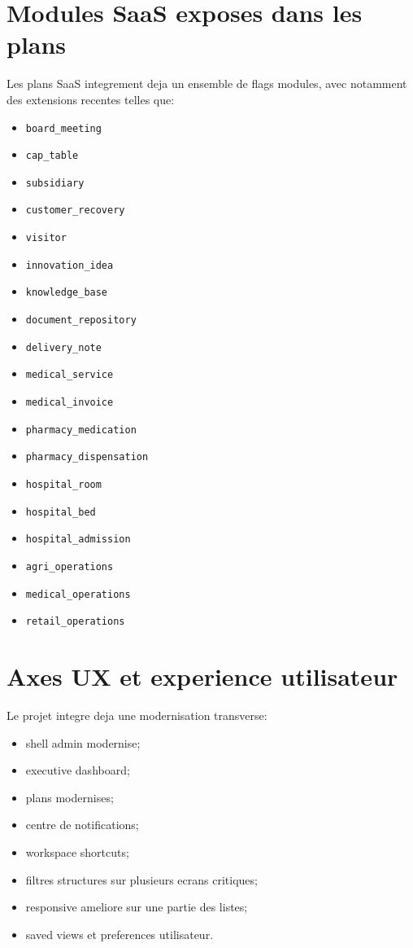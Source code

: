 \documentclass[11pt,a4paper]{article}
\begin{document}
\section{Modules SaaS exposes dans les plans}
Les plans SaaS integrement deja un ensemble de flags modules, avec notamment des extensions recentes telles que:
\begin{itemize}[leftmargin=1.2cm]
    \item \texttt{board\_meeting}
    \item \texttt{cap\_table}
    \item \texttt{subsidiary}
    \item \texttt{customer\_recovery}
    \item \texttt{visitor}
    \item \texttt{innovation\_idea}
    \item \texttt{knowledge\_base}
    \item \texttt{document\_repository}
    \item \texttt{delivery\_note}
    \item \texttt{medical\_service}
    \item \texttt{medical\_invoice}
    \item \texttt{pharmacy\_medication}
    \item \texttt{pharmacy\_dispensation}
    \item \texttt{hospital\_room}
    \item \texttt{hospital\_bed}
    \item \texttt{hospital\_admission}
    \item \texttt{agri\_operations}
    \item \texttt{medical\_operations}
    \item \texttt{retail\_operations}
\end{itemize}

\section{Axes UX et experience utilisateur}
Le projet integre deja une modernisation transverse:
\begin{itemize}[leftmargin=1.2cm]
    \item shell admin modernise;
    \item executive dashboard;
    \item plans modernises;
    \item centre de notifications;
    \item workspace shortcuts;
    \item filtres structures sur plusieurs ecrans critiques;
    \item responsive ameliore sur une partie des listes;
    \item saved views et preferences utilisateur.
\end{itemize}
\end{document}

